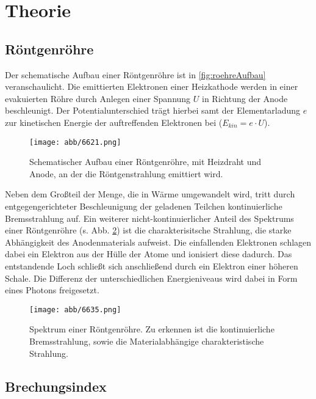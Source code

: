 \section{Theorie}
\label{sec:Theorie}

\subsection{Röntgenröhre}

Der schematische Aufbau einer Röntgenröhre ist in \autoref{fig:roehreAufbau} veranschaulicht.
Die emittierten Elektronen einer Heizkathode werden in einer evakuierten Röhre durch Anlegen einer Spannung $U$ in Richtung der Anode beschleunigt.
Der Potentialunterschied trägt hierbei samt der Elementarladung $e$ zur kinetischen Energie der auftreffenden Elektronen bei ($E_{kin} = e \cdot U$).
\begin{figure}
    \centering
    \texttt{[image: abb/6621.png]}
    \caption{Schematischer Aufbau einer Röntgenröhre, mit Heizdraht und Anode, an der die Röntgenstrahlung emittiert wird. \cite{roehre}}
    \label{fig:roehreAufbau}
\end{figure}
Neben dem Großteil der Menge, die in Wärme umgewandelt wird, tritt durch entgegengerichteter Beschleunigung der geladenen Teilchen kontinuierliche Bremsstrahlung auf.
Ein weiterer nicht-kontinuierlicher Anteil des Spektrums einer Röntgenröhre (s. Abb. \ref{fig:roehreSpektrum}) ist die charakterisitsche Strahlung,
die starke Abhängigkeit des Anodenmaterials aufweist. Die einfallenden Elektronen schlagen dabei ein Elektron aus der Hülle der Atome und ionisiert diese dadurch.
Das entstandende Loch schließt sich anschließend durch ein Elektron einer höheren Schale. Die Differenz der unterschiedlichen Energieniveaus wird dabei in Form eines Photons freigesetzt.
\begin{figure}
    \centering
    \texttt{[image: abb/6635.png]}
    \caption{Spektrum einer Röntgenröhre. Zu erkennen ist die kontinuierliche Bremsstrahlung, sowie die Materialabhängige charakteristische Strahlung.\cite{roehre}}
    \label{fig:roehreSpektrum}
\end{figure}

\subsection{Brechungsindex}
